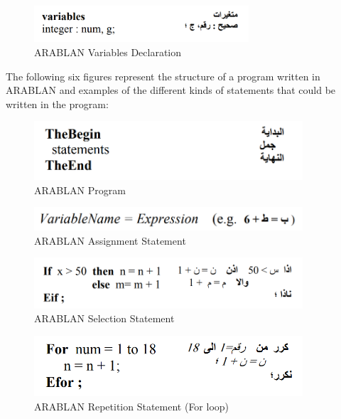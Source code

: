 \begin{figure}[h]
\centering
\includegraphics[width=8cm]{ch2-images/ARABLAN2.png}
\caption{ARABLAN Variables Declaration \cite{al2007evaluation}}
\label{fig:ARABLAN Variables Declaration}
\end{figure}

The following six figures represent the structure of a program written in ARABLAN and examples of the different kinds of statements that could be written in the program:

\begin{figure}[H]
\centering
\includegraphics[width=10cm]{ch2-images/ARABLAN3.png}
\caption{ARABLAN Program \cite{al2007evaluation}}
\label{fig:ARABLAN Program}
\end{figure}

\begin{figure}[H]
\centering
\includegraphics[width=10cm]{ch2-images/ARABLAN4.png}
\caption{ARABLAN Assignment Statement \cite{al2007evaluation}}
\label{fig:ARABLAN Assignment Statement}
\end{figure}

\begin{figure}[H]
\centering
\includegraphics[width=10cm]{ch2-images/ARABLAN5.png}
\caption{ARABLAN Selection Statement \cite{al2007evaluation}}
\label{fig:ARABLAN Selection Statement}
\end{figure}

\begin{figure}[H]
\centering
\includegraphics[width=10cm]{ch2-images/ARABLAN6.png}
\caption{ARABLAN Repetition Statement (For loop) \cite{al2007evaluation}}
\label{fig:ARABLAN Repetition Statement (For loop)}
\end{figure}

